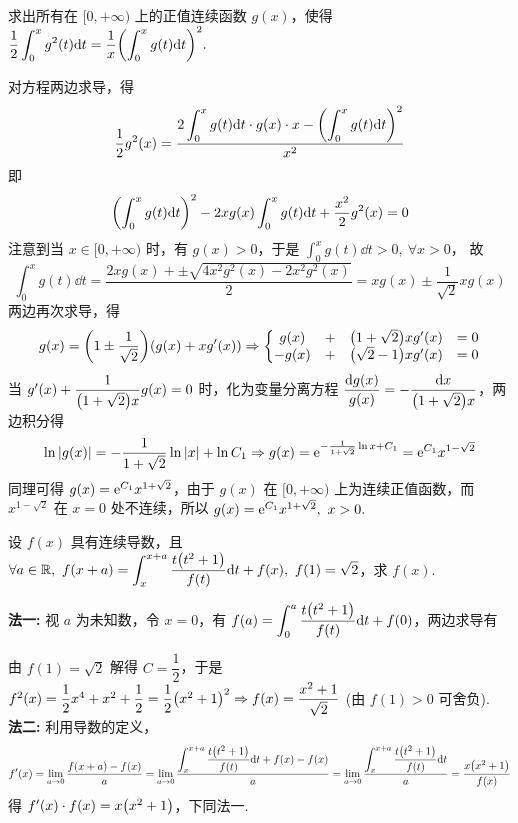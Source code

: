 \begin{example}
    求出所有在 $[0,+\infty)$ 上的正值连续函数 $g(x)$，使得 $\displaystyle\dfrac{1}{2}\int_{0}^{x}g^2(t)\dd t=\dfrac{1}{x}\qty(\int_{0}^{x}g(t)\dd t)^2.$
\end{example}
\begin{solution}
    对方程两边求导，得 $$\dfrac{1}{2}g^2(x)=\dfrac{2\displaystyle\int_{0}^{x}g(t)\dd t\cdot g(x)\cdot x-\qty(\displaystyle\int_{0}^{x}g(t)\dd t)^2}{x^2}$$
    即 $$\qty(\int_{0}^{x}g(t)\dd t)^2-2xg(x)\int_{0}^{x}g(t)\dd t+\dfrac{x^2}{2}g^2(x)=0$$
    注意到当 $x\in[0,+\infty)$ 时，有 $g(x)>0$，于是 $\displaystyle\int_{0}^{x}g(t)\dd t>0,~\forall x>0$，
    故 $$\int_{0}^{x}g(t)\dd t=\dfrac{2xg(x)+\pm\sqrt{4x^2g^2(x)-2x^2g^2(x)}}{2}=xg(x)\pm\dfrac{1}{\sqrt{2}}xg(x)$$
    两边再次求导，得 $$g(x)=\qty(1\pm\dfrac{1}{\sqrt{2}})(g(x)+xg'(x))\Rightarrow\left\{\begin{matrix}
            g(x)  & + & \qty(1+\sqrt2)xg'(x) & =0 \\
            -g(x) & + & \qty(\sqrt2-1)xg'(x) & =0
        \end{matrix}\right.$$
    当 $g'(x)+\dfrac{1}{\qty(1+\sqrt{2})x}g(x)=0$ 时，化为变量分离方程 $\dfrac{\dd g(x)}{g(x)}=-\dfrac{\dd x}{\qty(1+\sqrt{2})x}$，两边积分得
    $$\ln|g(x)|=-\dfrac{1}{1+\sqrt{2}}\ln|x|+\ln C_1\Rightarrow g(x)=\mathrm{e} ^{-\frac{1}{1+\sqrt2}\ln x+C_1}=\mathrm{e} ^{C_1}x^{1-\sqrt2}$$
    同理可得 $g(x)=\mathrm{e} ^{C_1}x^{1+\sqrt2}$，由于 $g(x)$ 在 $[0,+\infty)$ 上为连续正值函数，而 $x^{1-\sqrt2}$ 在 $x=0$ 处不连续，所以 $g(x)=\mathrm{e} ^{C_1}x^{1+\sqrt2},~x>0.$
\end{solution}

\begin{example}
    设 $f(x)$ 具有连续导数，且 $\forall a\in\mathbb{R},~f(x+a)=\displaystyle\int_{x}^{x+a}\dfrac{t\qty(t^2+1)}{f(t)}\dd t+f(x),~f(1)=\sqrt{2}$，求 $f(x)$.
\end{example}
\begin{solution}
    \textbf{法一: }视 $a$ 为未知数，令 $x=0$，有 $\displaystyle f(a)=\int_{0}^{a}\dfrac{t\qty(t^2+1)}{f(t)}\dd t+f(0)$，两边求导有
    由 $f(1)=\sqrt{2}$ 解得 $C=\dfrac{1}{2}$，于是 $f^2(x)=\dfrac{1}{2}x^4+x^2+\dfrac{1}{2}=\dfrac{1}{2}\qty(x^2+1)^2\Rightarrow f(x)=\dfrac{x^2+1}{\sqrt{2}}$ (由 $f(1)>0$ 可舍负).\\
    \textbf{法二: }利用导数的定义，
    $$f'(x)=\lim_{a\to0}\dfrac{f(x+a)-f(x)}{a}=\lim_{a\to0}\dfrac{\displaystyle \int_{x}^{x+a}\dfrac{t\qty(t^2+1)}{f(t)}\dd t+f(x)-f(x)}{a}=\lim_{a\to0}\dfrac{\displaystyle \int_{x}^{x+a}\dfrac{t\qty(t^2+1)}{f(t)}\dd t}{a}=\dfrac{x\qty(x^2+1)}{f(x)}$$
    得 $f'(x)\cdot f(x)=x\qty(x^2+1)$，下同法一.
\end{solution}

